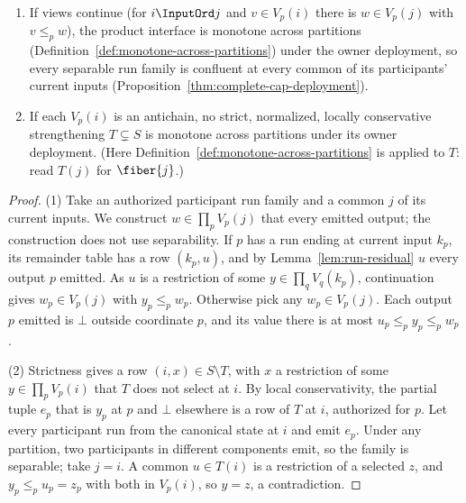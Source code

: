 \begin{theorem}
\label{thm:product-frontier}
\begin{enumerate}
  \item If views continue (for $i\InputOrd j$ and $v\in V_p(i)$ there is $w\in
        V_p(j)$ with $v\le_p w$), the product interface is monotone across
        partitions (Definition~\ref{def:monotone-across-partitions}) under the
        owner deployment, so every separable run family is confluent at every
        common \indesc of its participants' current inputs
        (Proposition~\ref{thm:complete-cap-deployment}).
  \item If each $V_p(i)$ is an antichain, no strict, normalized, locally
        conservative strengthening $T\subsetneq S$ is monotone across
        partitions under its owner deployment.  (Here
        Definition~\ref{def:monotone-across-partitions} is applied to $T$:
        read $T(j)$ for $\fiber{j}$.)
\end{enumerate}
\end{theorem}

\begin{proof}
(1) Take an authorized participant run family and a common \indesc $j$ of its
current inputs.  We construct $w\in\prod_pV_p(j)$ that \outrel every emitted
output; the construction does not use separability.  If $p$ has a run ending at
current input $k_p$, its remainder table has a row $(k_p,u)$, and by
Lemma~\ref{lem:run-residual} $u$ \outrel every output $p$ emitted.  As $u$ is a
restriction of some $y\in\prod_qV_q(k_p)$, continuation gives $w_p\in V_p(j)$
with $y_p\le_p w_p$.  Otherwise pick any $w_p\in V_p(j)$.  Each output $p$
emitted is $\bot$ outside coordinate $p$, and its value there is at most
$u_p\le_p y_p\le_p w_p$.

(2) Strictness gives a row $(i,x)\in S\setminus T$, with $x$ a restriction of
some $y\in\prod_pV_p(i)$ that $T$ does not select at $i$.  By local
conservativity, the partial tuple $e_p$ that is $y_p$ at $p$ and $\bot$
elsewhere is a row of $T$ at $i$, authorized for $p$.  Let every participant
run from the canonical state at $i$ and emit $e_p$.  Under any partition, two
participants in different components emit, so the family is separable; take
$j=i$.  A common \outnoun $u\in T(i)$ is a restriction of a selected $z$, and
$y_p\le_p u_p=z_p$ with both in $V_p(i)$, so $y=z$, a contradiction.
\end{proof}

